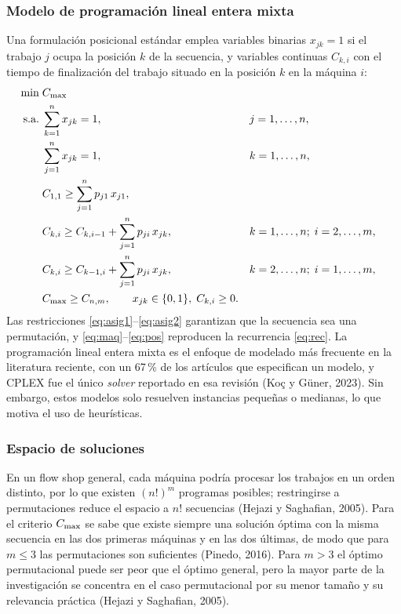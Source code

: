 \subsubsection{Modelo de programación lineal entera mixta}

Una formulación posicional estándar emplea variables binarias $x_{jk}=1$ si el trabajo
$j$ ocupa la posición $k$ de la secuencia, y variables continuas $C_{k,i}$ con el tiempo
de finalización del trabajo situado en la posición $k$ en la máquina $i$:
\begin{align}
\min\;& C_{\max} \label{eq:obj}\\
\text{s.a.}\;& \sum_{k=1}^{n} x_{jk} = 1, && j=1,\ldots,n, \label{eq:asig1}\\
& \sum_{j=1}^{n} x_{jk} = 1, && k=1,\ldots,n, \label{eq:asig2}\\
& C_{1,1} \ge \sum_{j=1}^{n} p_{j1}\,x_{j1}, \label{eq:ini}\\
& C_{k,i} \ge C_{k,i-1} + \sum_{j=1}^{n} p_{ji}\,x_{jk}, && k=1,\ldots,n;\; i=2,\ldots,m, \label{eq:maq}\\
& C_{k,i} \ge C_{k-1,i} + \sum_{j=1}^{n} p_{ji}\,x_{jk}, && k=2,\ldots,n;\; i=1,\ldots,m, \label{eq:pos}\\
& C_{\max} \ge C_{n,m}, \qquad x_{jk}\in\{0,1\},\; C_{k,i}\ge 0. \label{eq:dom}
\end{align}
Las restricciones \eqref{eq:asig1}--\eqref{eq:asig2} garantizan que la secuencia sea una
permutación, y \eqref{eq:maq}--\eqref{eq:pos} reproducen la recurrencia \eqref{eq:rec}. La
programación lineal entera mixta es el enfoque de modelado más frecuente en la
literatura reciente, con un 67\,\% de los artículos que especifican un modelo, y
CPLEX fue el único \textit{solver} reportado en esa revisión (Koç y Güner, 2023).
Sin embargo, estos modelos solo resuelven instancias pequeñas o medianas, lo que
motiva el uso de heurísticas.

\subsubsection{Espacio de soluciones}

En un flow shop general, cada máquina podría procesar los trabajos en un orden distinto,
por lo que existen $(n!)^m$ programas posibles; restringirse a permutaciones reduce el
espacio a $n!$ secuencias (Hejazi y Saghafian, 2005). Para el criterio $C_{\max}$ se sabe
que existe siempre una solución óptima con la misma secuencia en las dos primeras
máquinas y en las dos últimas, de modo que para $m\le 3$ las permutaciones son
suficientes (Pinedo, 2016). Para $m>3$ el óptimo permutacional puede ser peor que el
óptimo general, pero la mayor parte de la investigación se concentra en el caso
permutacional por su menor tamaño y su relevancia práctica (Hejazi y Saghafian, 2005).

